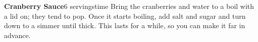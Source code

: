 \documentclass[../Cookbook.tex]{subfiles}
\begin{document}
\begin{recipe}[CranberrySauce]{\textbf{Cranberry Sauce}}{6 servings}{time}
Bring the cranberries and water to a boil with a lid on; they tend to pop. Once it starts boiling, add salt and sugar and turn down to a simmer until thick. This lasts for a while, so you can make it far in advance.
\end{recipe}
\end{document}
